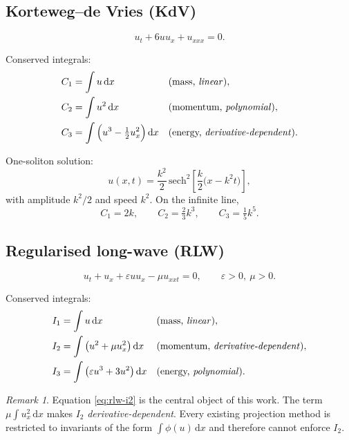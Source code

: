 \documentclass[11pt,a4paper]{article}
\theoremstyle{remark}
\newtheorem{remark}{Remark}
\newcommand{\dx}{\,\mathrm{d}x}
\begin{document}
\subsection{Korteweg--de Vries (KdV)}

\begin{equation}
u_t + 6uu_x + u_{xxx} = 0 .
\label{eq:kdv}
\end{equation}

Conserved integrals:
\begin{align}
C_1 &= \int u \dx && \text{(mass, \emph{linear})}, \label{eq:kdv-c1}\\
C_2 &= \int u^2 \dx && \text{(momentum, \emph{polynomial})}, \label{eq:kdv-c2}\\
C_3 &= \int \Big(u^3 - \tfrac12 u_x^2\Big) \dx && \text{(energy, \emph{derivative-dependent})}. \label{eq:kdv-c3}
\end{align}

One-soliton solution:
\begin{equation}
u(x,t) = \frac{k^2}{2}\,\mathrm{sech}^2\!\left[\frac{k}{2}\big(x - k^2 t\big)\right],
\end{equation}
with amplitude $k^2/2$ and speed $k^2$. On the infinite line,
\begin{equation}
C_1 = 2k, \qquad C_2 = \tfrac{2}{3}k^3, \qquad C_3 = \tfrac{1}{5}k^5 .
\end{equation}

\subsection{Regularised long-wave (RLW)}

\begin{equation}
u_t + u_x + \varepsilon u u_x - \mu u_{xxt} = 0, \qquad \varepsilon>0,\ \mu>0 .
\label{eq:rlw}
\end{equation}

Conserved integrals:
\begin{align}
I_1 &= \int u \dx && \text{(mass, \emph{linear})}, \label{eq:rlw-i1}\\
I_2 &= \int \big(u^2 + \mu u_x^2\big) \dx && \text{(momentum, \emph{derivative-dependent})}, \label{eq:rlw-i2}\\
I_3 &= \int \big(\varepsilon u^3 + 3u^2\big) \dx && \text{(energy, \emph{polynomial})}. \label{eq:rlw-i3}
\end{align}

\begin{remark}
Equation \eqref{eq:rlw-i2} is the central object of this work. The term
$\mu\int u_x^2\dx$ makes $I_2$ \emph{derivative-dependent}. Every existing
projection method is restricted to invariants of the form $\int \phi(u)\dx$ and
therefore cannot enforce $I_2$.
\end{remark}
\end{document}
